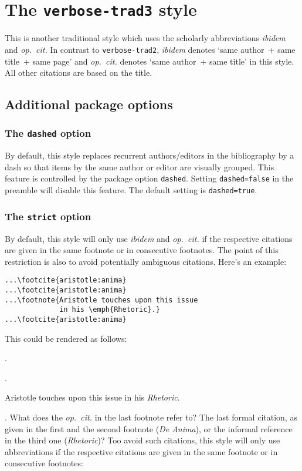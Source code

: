 \documentclass[a4paper]{article}
\newenvironment*{pseudofootnotes}
  {\list\labelenumi{%
     \def\makelabel##1{\hss\llap{##1}}%
     \def\labelenumi{\theenumi}%
     \usecounter{enumi}%
     \setlength{\leftmargin}{0pt}%
     \setlength{\labelsep}{0.75em}%
     \setlength{\itemsep}{0pt}%
     \setlength{\parsep}{0pt}}%
   \citereset
   \footnotesize
   \def\footcite##1{\item\Cite{##1}.}%
   \def\footnote##1{\item##1}}
  {\endlist}
\begin{document}
\section*{The \texttt{verbose-trad3} style}

This is another traditional style which uses the scholarly abbreviations \emph{ibidem} and \emph{op.~cit.} In contrast to \texttt{verbose-trad2}, \emph{ibidem} denotes `same author~+ same title~+ same page' and \emph{op.~cit.} denotes `same author~+ same title' in this style. All other citations are based on the title.

\subsection*{Additional package options}

\subsubsection*{The \texttt{dashed} option}

By default, this style replaces recurrent authors/editors in the
bibliography by a dash so that items by the same author or editor
are visually grouped. This feature is controlled by the package
option \texttt{dashed}. Setting \texttt{dashed=false} in the
preamble will disable this feature. The default setting is
\texttt{dashed=true}.

\subsubsection*{The \texttt{strict} option}

By default, this style will only use \emph{ibidem} and
\emph{op.~cit.} if the respective citations are given in the same
footnote or in consecutive footnotes. The point of this restriction
is also to avoid potentially ambiguous citations. Here's an example:

\begin{verbatim}
...\footcite{aristotle:anima}
...\footcite{aristotle:anima}
...\footnote{Aristotle touches upon this issue 
             in his \emph{Rhetoric}.}
...\footcite{aristotle:anima}
\end{verbatim}
%
This could be rendered as follows:

\begin{pseudofootnotes}
\footcite{aristotle:anima}
\footcite{aristotle:anima}
\footnote{Aristotle touches upon this issue in his \emph{Rhetoric}.}
\footcite{aristotle:anima}
\end{pseudofootnotes}
%
What does the \emph{op.~cit.} in the last footnote refer to? The last formal citation, as given in the first and the second footnote (\emph{De Anima}), or the informal reference in the third one (\emph{Rhetoric})? Too avoid such citations, this style will only use abbreviations if the respective citations are given in the same footnote or in consecutive footnotes:
\end{document}
